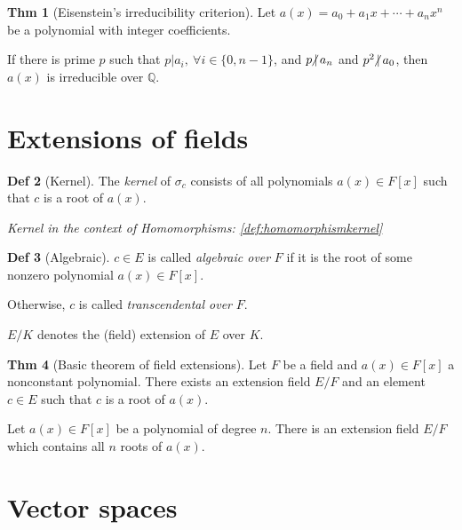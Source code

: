 \documentclass{article}
\theoremstyle{definition}
\newtheorem{definition}{Def}[section]
\newtheorem{theorem}[definition]{Thm}
\newcommand{\ndiv}{\hspace{-4pt}\not|\hspace{2pt}}
\begin{document}
\begin{theorem}[Eisenstein's irreducibility criterion]
    Let $a(x) = a_0 + a_1 x + \cdots + a_n x^n$ be a polynomial with integer coefficients.

    If there is prime $p$ such that $p | a_i, ~\forall i\in\{0, n-1\}$, and $p \ndiv a_n$ and $p^2 \ndiv a_0$, then $a(x)$ is irreducible over $\mathbb{Q}$.
\end{theorem}

\section{Extensions of fields}

\begin{definition}[Kernel]\label{def:extensionkernel}
    The \emph{kernel} of $\sigma_c$ consists of all polynomials $a(x) \in F[x]$ such that $c$ is a root of $a(x)$.

    \emph{Kernel in the context of Homomorphisms: \ref{def:homomorphismkernel}}
\end{definition}

\begin{definition}[Algebraic]
    $c \in E$ is called \emph{algebraic over} $F$ if it is the root of some nonzero polynomial $a(x) \in F[x]$.

    Otherwise, $c$ is called \emph{transcendental over} $F$.
\end{definition}

$E/K$ denotes the (field) extension of $E$ over $K$.

\begin{theorem}[Basic theorem of field extensions]
    Let $F$ be a field and $a(x) \in F[x]$ a nonconstant polynomial. There exists an extension field $E/F$ and an element $c \in E$ such that $c$ is a root of $a(x)$.
\end{theorem}

Let $a(x) \in F[x]$ be a polynomial of degree $n$. There is an extension field $E/F$ which contains all $n$ roots of $a(x)$.

\section{Vector spaces}
\end{document}
